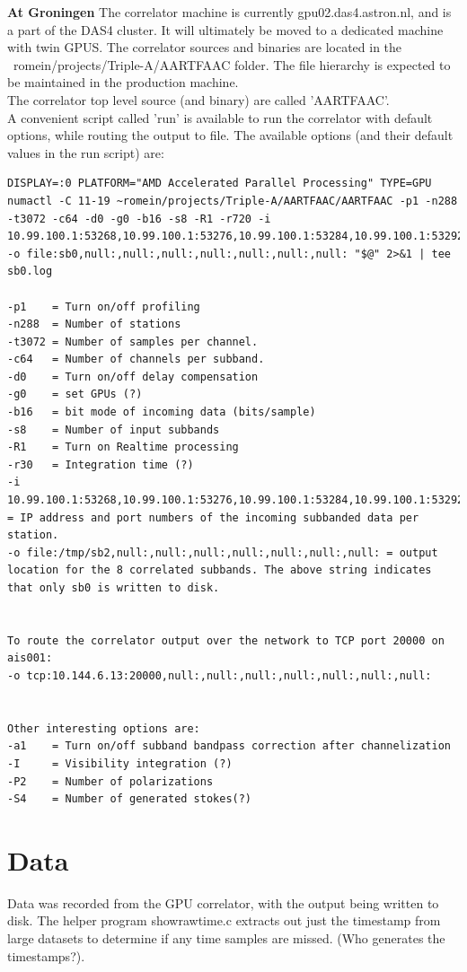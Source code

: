 \documentclass {article}
\begin{document}
\textbf {At Groningen} The correlator machine is currently gpu02.das4.astron.nl,
and is a part  of the DAS4 cluster.  It will ultimately  be moved to a dedicated
machine with twin  GPUS. The correlator sources and binaries  are located in the
~romein/projects/Triple-A/AARTFAAC folder.  The file hierarchy is expected to be
maintained in  the production  machine.\\ The correlator  top level  source (and
binary) are called  'AARTFAAC'.\\ A convenient script called  'run' is available
to  run  the  correlator with  default  options,  while  routing the  output  to
file. The  available options (and  their default values in the run script) are:
\begin{verbatim}
DISPLAY=:0 PLATFORM="AMD Accelerated Parallel Processing" TYPE=GPU numactl -C 11-19 ~romein/projects/Triple-A/AARTFAAC/AARTFAAC -p1 -n288 -t3072 -c64 -d0 -g0 -b16 -s8 -R1 -r720 -i 10.99.100.1:53268,10.99.100.1:53276,10.99.100.1:53284,10.99.100.1:53292,10.99.100.1:53300,10.99.100.1:53308 -o file:sb0,null:,null:,null:,null:,null:,null:,null: "$@" 2>&1 | tee sb0.log

-p1    = Turn on/off profiling
-n288  = Number of stations
-t3072 = Number of samples per channel.
-c64   = Number of channels per subband.
-d0    = Turn on/off delay compensation
-g0    = set GPUs (?)
-b16   = bit mode of incoming data (bits/sample)
-s8    = Number of input subbands
-R1    = Turn on Realtime processing
-r30   = Integration time (?)
-i
10.99.100.1:53268,10.99.100.1:53276,10.99.100.1:53284,10.99.100.1:53292,10.99.100.1:53300,10.99.100.1:53308
= IP address and port numbers of the incoming subbanded data per station.
-o file:/tmp/sb2,null:,null:,null:,null:,null:,null:,null: = output location for the 8 correlated subbands. The above string indicates that only sb0 is written to disk. 


To route the correlator output over the network to TCP port 20000 on ais001:
-o tcp:10.144.6.13:20000,null:,null:,null:,null:,null:,null:,null:


Other interesting options are:
-a1    = Turn on/off subband bandpass correction after channelization
-I     = Visibility integration (?)
-P2    = Number of polarizations
-S4    = Number of generated stokes(?)
\end{verbatim}

\section {Data}
Data was recorded from the GPU correlator, with the output being written to
disk. The helper program showrawtime.c extracts out just the timestamp from
large datasets to determine if any time samples are missed. (Who generates the
timestamps?). 
\end{document}
